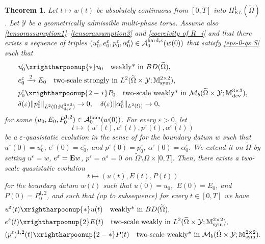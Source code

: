 \documentclass[reqno,10pt]{amsart}
\numberwithin{equation}{section}
\newtheorem{theorem}{Theorem}[section]
\theoremstyle{remark}
\newcommand{\calA}{\mathcal{A}}
\newcommand{\M}{\mathbb{M}}
\newcommand{\calY}{\mathcal{Y}}
\DeclareMathOperator{\dev}{dev}
\DeclareMathOperator{\sym}{sym}
\newcommand{\weakstar}{\xrightharpoonup{*}}
\newcommand{\strongtwoscale}{\xrightarrow{\,2\,}}
\newcommand{\weaktwoscale}{\xrightharpoonup{2}}
\newcommand{\weakstartwoscale}{\xrightharpoonup{2-*}}
\newcommand{\eps}{\varepsilon}
\newcommand{\Mb}{\mathcal{M}_b}
\newcommand{\ext}[1]{\widetilde{#1}}
\newcommand{\E}{{\bf E}}
\begin{document}
\begin{theorem} \label{main result 2}
Let $t \mapsto w(t)$ be absolutely continuous from $[0,T]$ into $H^1_{KL}(\ext{\Omega})$. 
Let $\calY$ be a geometrically admissible multi-phase torus. 
Assume also \eqref{tensorassumption1}--\eqref{tensorassumption3} and \eqref{coercivity of R_i} and 
that there exists a sequence of triples $(u^\eps_0, e^\eps_0, p^\eps_0, \alpha^\eps_0) \in \calA_{0}^{\rm hard,\eps}(w(0))$ that satisfy \ref{eps-0-qs S} such that
\begin{align}
	& u^\eps_0 \weakstar u_0 \quad \text{weakly* in $BD(\ext{\Omega})$}, \label{main result u^eps_0 condition}\\
	& e^\eps_0 \strongtwoscale E_0 \quad \text{two-scale strongly in $L^2(\ext{\Omega} \times \calY;\M^{2 \times 2}_{\sym})$}, \label{main result e^eps_0 condition}\\
	& p^\eps_0 \weakstartwoscale P_0 \quad \text{two-scale weakly* in $\Mb(\ext{\Omega} \times \calY;\M^{3 \times 3}_{\dev})$}, \label{main result p^eps_0 condition}\\ \label{initial con}
	& \delta(\eps) \|p_0^\eps\|_{L^2(\Omega;\M^{3\times 3}_{\dev})} \to 0, \quad \delta(\eps) \|\alpha_0^\eps\|_{L^2(\Omega)} \to 0, 
\end{align}
for some $(u_0,E_0,P_0^{1,2}) \in \calA^{\rm hom}_{0}(w(0))$. 
For every $\eps > 0$, let 
\begin{equation*}
	t \mapsto (u^\eps(t), e^\eps(t), p^\eps(t), \alpha^{\eps}(t))
\end{equation*}
be a $\eps$-quasistatic evolution in the sense of  for the boundary datum $w$ such that $u^\eps(0) = u^\eps_0$, $e^\eps(0) = e^\eps_0$, and $p^\eps(0) = p^\eps_0$, $\alpha^\eps(0) = \alpha^\eps_0$. 
We extend it on $\ext{\Omega}$ by setting $u^{\eps}=w$, $e^{\eps}={\E}w$, $p^{\eps}=\alpha^{\eps}=0$ on $\ext{\Omega} \setminus \Omega \times [0,T[$. 
Then, there exists a two-scale quasistatic evolution
\begin{equation*}
	t \mapsto (u(t), E(t), P(t)) %
\end{equation*}
for the boundary datum $w(t)$ such that $u(0) = u_0$,\, $E(0) = E_0$, and $P(0) = P_0^{1,2}$, and such that (up to subsequence)
for every $t \in [0,T]$ we have
\begin{align}
	& u^\eps(t) \weakstar u(t) \quad \text{weakly* in $BD(\ext{\Omega})$}, \label{main result 0 u^eps(t) - regime zero}\\
	& e^\eps(t) \weaktwoscale E(t) \quad \text{two-scale weakly in $L^2(\ext{\Omega} \times \calY;\M^{2 \times 2}_{\sym})$}, \label{main result e^eps(t) - regime zero}\\
	& (p^\eps)^{1,2}(t) \weakstartwoscale P(t) \quad \text{two-scale weakly* in $\Mb(\ext{\Omega} \times \calY;\M^{2 \times 2}_{\sym})$}. \label{main result p^eps(t) - regime zero}
\end{align}
\end{theorem}
\end{document}
